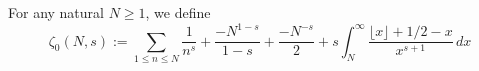 \begin{definition}[riemannZeta0]
\label{riemannZeta0}
\leanok
For any natural $N\ge1$, we define
  $$
  \zeta_0(N,s) :=
  \sum_{1\le n \le N} \frac1{n^s}
  +
  \frac{- N^{1-s}}{1-s} + \frac{-N^{-s}}{2} + s \int_N^\infty \frac{\lfloor x\rfloor + 1/2 - x}{x^{s+1}} \, dx
  $$
\end{definition}
